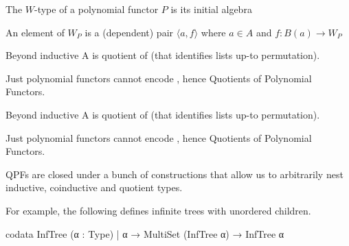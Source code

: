 \documentclass[t,12pt]{beamer}
\begin{document}
\begin{frame}
    \begin{definition}
        The $W$-type of a polynomial functor $P$ is its initial algebra
    \end{definition}

    \medskip

    An element of $W_P$ is a (dependent) pair $⟨a, f⟩$ where $a ∈ A$ and $f : B(a) → W_P$

    \bigskip

\end{frame}

\begin{frame}[fragile]{Beyond inductive}
    A  is quotient of  (that identifies lists up-to permutation).

    \bigskip

    Just polynomial functors cannot encode , hence 
    Quotients of Polynomial Functors.
\end{frame}

\begin{frame}[fragile]{Beyond inductive}
    A  is quotient of  (that identifies lists up-to permutation).

    \bigskip

    Just polynomial functors cannot encode , hence 
    Quotients of Polynomial Functors.

    \bigskip

    QPFs are closed under a bunch of constructions that allow us to arbitrarily nest inductive, 
    coinductive and quotient types.

    \bigskip

    For example, the following defines infinite trees with unordered children.
    \begin{leancode}
codata InfTree (α : Type)
  | α → MultiSet (InfTree α) → InfTree α
    \end{leancode}
\end{frame}
\end{document}
